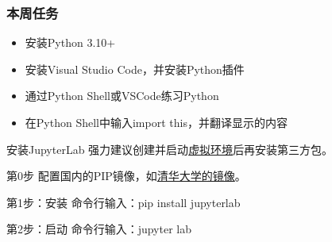 \documentclass[aspectratio=169, 14pt]{beamer}
\begin{document}
\begin{frame}
	\frametitle{本周任务}
	\begin{itemize}
		\item 安装Python 3.10+
		\item 安装Visual Studio Code，并安装Python插件
		\item 通过Python Shell或VSCode练习Python
		\item 在Python Shell中输入\alert{import this}，并翻译显示的内容
	\end{itemize}
\end{frame}

\begin{frame}{安装JupyterLab}
	强力建议创建并启动\href{https://docs.python.org/3/tutorial/venv.html}{虚拟环境}后再安装第三方包。
	\begin{block}{第0步}
		配置国内的PIP镜像，如\href{https://mirrors.tuna.tsinghua.edu.cn/help/pypi/}{清华大学的镜像}。
	\end{block}
	\begin{block}{第1步：安装}
		命令行输入：pip install jupyterlab
	\end{block}
	\begin{block}{第2步：启动}
		命令行输入：jupyter lab
	\end{block}
\end{frame}
\end{document}
